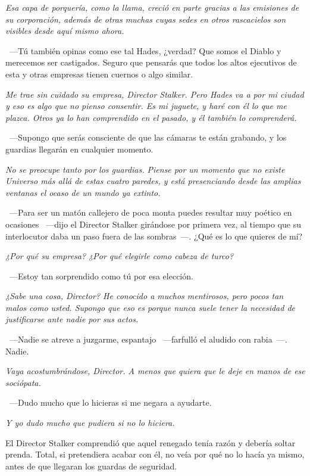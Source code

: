 \emph{Esa capa de porquería, como la llama, creció en parte gracias a las emisiones de su corporación, además de otras muchas cuyas sedes en otros rascacielos son visibles desde aquí mismo ahora.}

~---Tú también opinas como ese tal Hades, ¿verdad? Que somos el Diablo y merecemos ser castigados. Seguro que pensarás que todos los altos ejecutivos de esta y otras empresas tienen cuernos o algo similar.

\emph{Me trae sin cuidado su empresa, Director Stalker. Pero Hades va a por mi ciudad y eso es algo que no pienso consentir. Es mi juguete, y haré con él lo que me plazca. Otros ya lo han comprendido en el pasado, y él también lo comprenderá.}

~---Supongo que serás consciente de que las cámaras te están grabando, y los guardias llegarán en cualquier momento.

\emph{No se preocupe tanto por los guardias. Piense por un momento que no existe Universo más allá de estas cuatro paredes, y está presenciando desde las amplias ventanas el ocaso de un mundo ya extinto.}

~---Para ser un matón callejero de poca monta puedes resultar muy poético en ocasiones ~---dijo el Director Stalker girándose por primera vez, al tiempo que su interlocutor daba un paso fuera de las sombras~---. ¿Qué es lo que quieres de mí?

\emph{¿Por qué su empresa? ¿Por qué elegirle como cabeza de turco?}

~---Estoy tan sorprendido como tú por esa elección.

\emph{¿Sabe una cosa, Director? He conocido a muchos mentirosos, pero pocos tan malos como usted. Supongo que eso es porque nunca suele tener la necesidad de justificarse ante nadie por sus actos.}

~---Nadie se atreve a juzgarme, espantajo ~---farfulló el aludido con rabia~---. Nadie.

\emph{Vaya acostumbrándose, Director. A menos que quiera que le deje en manos de ese sociópata.}

~---Dudo mucho que lo hicieras si me negara a ayudarte.

\emph{Y yo dudo mucho que pudiera si no lo hiciera.}

El Director Stalker comprendió que aquel renegado tenía razón y debería soltar prenda. Total, si pretendiera acabar con él, no veía por qué no lo hacía ya mismo, antes de que llegaran los guardas de seguridad.

